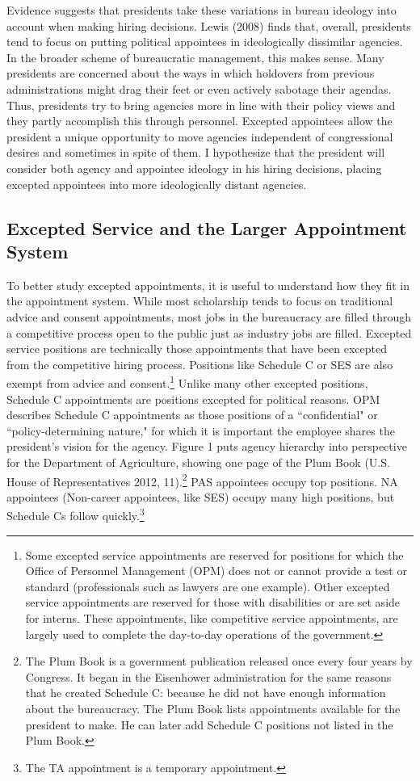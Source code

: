 \documentclass[12pt]{article}
\begin{document}
Evidence suggests that presidents take these variations in bureau ideology into account when making hiring decisions. Lewis (2008) finds that, overall, presidents tend to focus on putting political appointees in ideologically dissimilar agencies. In the broader scheme of bureaucratic management, this makes sense. Many presidents are concerned about the ways in which holdovers from previous administrations might drag their feet or even actively sabotage their agendas. Thus, presidents try to bring agencies more in line with their policy views and they partly accomplish this through personnel. Excepted appointees allow the president a unique opportunity to move agencies independent of congressional desires and sometimes in spite of them. I hypothesize that the president will consider both agency and appointee ideology in his hiring decisions, placing excepted appointees into more ideologically distant agencies.

\subsection*{Excepted Service and the Larger Appointment System}

	To better study excepted appointments, it is useful to understand how they fit in the appointment system. While most scholarship tends to focus on traditional advice and consent appointments, most jobs in the bureaucracy are filled through a competitive process open to the public just as industry jobs are filled. Excepted service positions are technically those appointments that have been excepted from the competitive hiring process. Positions like Schedule C or SES are also exempt from advice and consent.\footnote{Some excepted service appointments are reserved for positions for which the Office of Personnel Management (OPM) does not or cannot provide a test or standard (professionals such as lawyers are one example). Other excepted service appointments are reserved for those with disabilities or are set aside for interns. These appointments, like competitive service appointments, are largely used to complete the day-to-day operations of the government.}	Unlike many other excepted positions, Schedule C appointments are positions excepted for political reasons. OPM describes Schedule C appointments as those positions of a ``confidential" or ``policy-determining nature," for which it is important the employee shares the president's vision for the agency. Figure 1 puts agency hierarchy into perspective for the Department of Agriculture, showing one page of the Plum Book (U.S. House of Representatives 2012, 11).\footnote{The Plum Book is a government publication released once every four years by Congress. It began in the Eisenhower administration for the same reasons that he created Schedule C: because he did not have enough information about the bureaucracy. The Plum Book lists appointments available for the president to make. He can later add Schedule C positions not listed in the Plum Book.} PAS appointees occupy top positions. NA appointees (Non-career appointees, like SES) occupy many high positions, but Schedule Cs follow quickly.\footnote{The TA appointment is a temporary appointment.}
	
\end{document}
